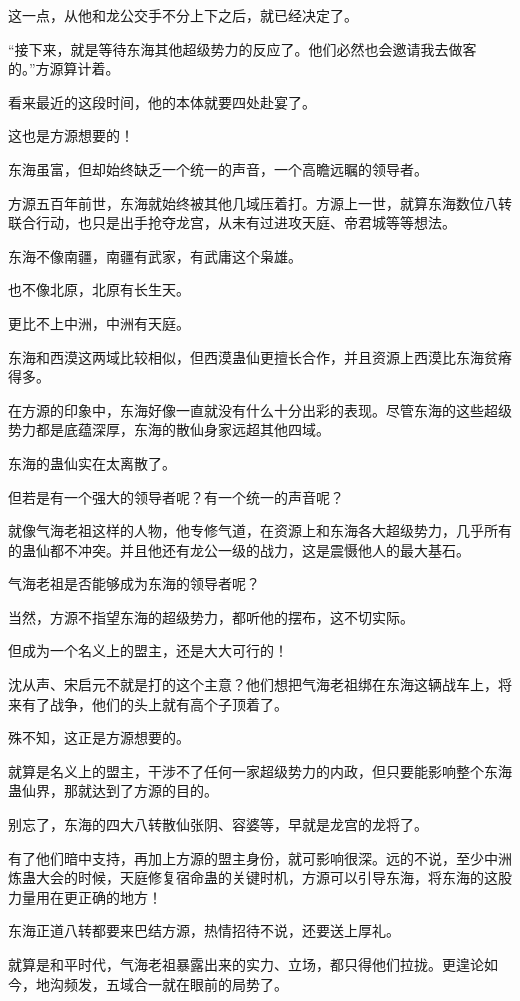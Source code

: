 \begin{this_body}
这一点，从他和龙公交手不分上下之后，就已经决定了。

“接下来，就是等待东海其他超级势力的反应了。他们必然也会邀请我去做客的。”方源算计着。

看来最近的这段时间，他的本体就要四处赴宴了。

这也是方源想要的！

东海虽富，但却始终缺乏一个统一的声音，一个高瞻远瞩的领导者。

方源五百年前世，东海就始终被其他几域压着打。方源上一世，就算东海数位八转联合行动，也只是出手抢夺龙宫，从未有过进攻天庭、帝君城等等想法。

东海不像南疆，南疆有武家，有武庸这个枭雄。

也不像北原，北原有长生天。

更比不上中洲，中洲有天庭。

东海和西漠这两域比较相似，但西漠蛊仙更擅长合作，并且资源上西漠比东海贫瘠得多。

在方源的印象中，东海好像一直就没有什么十分出彩的表现。尽管东海的这些超级势力都是底蕴深厚，东海的散仙身家远超其他四域。

东海的蛊仙实在太离散了。

但若是有一个强大的领导者呢？有一个统一的声音呢？

就像气海老祖这样的人物，他专修气道，在资源上和东海各大超级势力，几乎所有的蛊仙都不冲突。并且他还有龙公一级的战力，这是震慑他人的最大基石。

气海老祖是否能够成为东海的领导者呢？

当然，方源不指望东海的超级势力，都听他的摆布，这不切实际。

但成为一个名义上的盟主，还是大大可行的！

沈从声、宋启元不就是打的这个主意？他们想把气海老祖绑在东海这辆战车上，将来有了战争，他们的头上就有高个子顶着了。

殊不知，这正是方源想要的。

就算是名义上的盟主，干涉不了任何一家超级势力的内政，但只要能影响整个东海蛊仙界，那就达到了方源的目的。

别忘了，东海的四大八转散仙张阴、容婆等，早就是龙宫的龙将了。

有了他们暗中支持，再加上方源的盟主身份，就可影响很深。远的不说，至少中洲炼蛊大会的时候，天庭修复宿命蛊的关键时机，方源可以引导东海，将东海的这股力量用在更正确的地方！

东海正道八转都要来巴结方源，热情招待不说，还要送上厚礼。

就算是和平时代，气海老祖暴露出来的实力、立场，都只得他们拉拢。更遑论如今，地沟频发，五域合一就在眼前的局势了。


\end{this_body}
